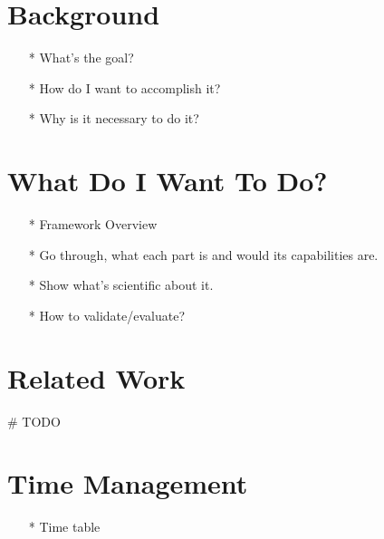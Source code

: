 \documentclass[a4paper,11pt]{article}
\begin{document}
\section{Background}
\begin{itemize}
    \item[*] What's the goal?
    \item[*] How do I want to accomplish it?
    \item[*] Why is it necessary to do it?
\end{itemize}

\section{What Do I Want To Do?}
\begin{itemize}
    \item[*] Framework Overview
    \item[*] Go through, what each part is and would its capabilities are.
    \item[*] Show what's scientific about it.
    \item[*] How to validate/evaluate?
\end{itemize}

\section{Related Work}
\# TODO

\section{Time Management}
\begin{itemize}
    \item[*] Time table
\end{itemize}
\end{document}
